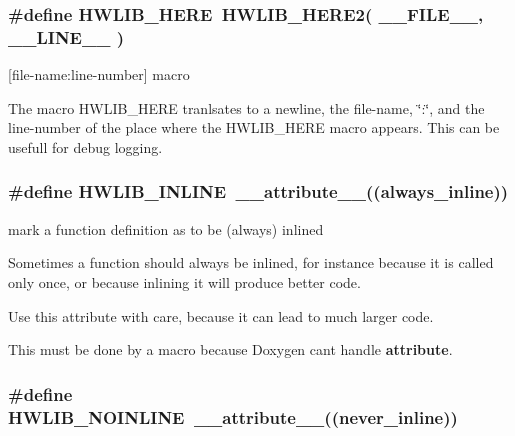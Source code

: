 \subsubsection[{\texorpdfstring{H\+W\+L\+I\+B\+\_\+\+H\+E\+RE}{HWLIB_HERE}}]{\setlength{\rightskip}{0pt plus 5cm}\#define H\+W\+L\+I\+B\+\_\+\+H\+E\+RE~H\+W\+L\+I\+B\+\_\+\+H\+E\+R\+E2( \+\_\+\+\_\+\+F\+I\+L\+E\+\_\+\+\_\+, \+\_\+\+\_\+\+L\+I\+N\+E\+\_\+\+\_\+ )}\hypertarget{hwlib-defines_8hpp_a360fe3b1713068844a760bed1aa1384a}{}\label{hwlib-defines_8hpp_a360fe3b1713068844a760bed1aa1384a}


\mbox{[}file-\/name\+:line-\/number\mbox{]} macro 

The macro H\+W\+L\+I\+B\+\_\+\+H\+E\+RE tranlsates to a newline, the file-\/name, \char`\"{}\+:\char`\"{}, and the line-\/number of the place where the H\+W\+L\+I\+B\+\_\+\+H\+E\+RE macro appears. This can be usefull for debug logging. 
\subsubsection[{\texorpdfstring{H\+W\+L\+I\+B\+\_\+\+I\+N\+L\+I\+NE}{HWLIB_INLINE}}]{\setlength{\rightskip}{0pt plus 5cm}\#define H\+W\+L\+I\+B\+\_\+\+I\+N\+L\+I\+NE~\+\_\+\+\_\+attribute\+\_\+\+\_\+((always\+\_\+inline))}\hypertarget{hwlib-defines_8hpp_a520a8905adc71f1757aea4ce05183585}{}\label{hwlib-defines_8hpp_a520a8905adc71f1757aea4ce05183585}


mark a function definition as to be (always) inlined 

Sometimes a function should always be inlined, for instance because it is called only once, or because inlining it will produce better code.

Use this attribute with care, because it can lead to much larger code.

This must be done by a macro because Doxygen can\textquotesingle{}t handle {\bfseries attribute}. 
\subsubsection[{\texorpdfstring{H\+W\+L\+I\+B\+\_\+\+N\+O\+I\+N\+L\+I\+NE}{HWLIB_NOINLINE}}]{\setlength{\rightskip}{0pt plus 5cm}\#define H\+W\+L\+I\+B\+\_\+\+N\+O\+I\+N\+L\+I\+NE~\+\_\+\+\_\+attribute\+\_\+\+\_\+((never\+\_\+inline))}\hypertarget{hwlib-defines_8hpp_a2bec10dcdff9c6b29f603813007f2ffa}{}\label{hwlib-defines_8hpp_a2bec10dcdff9c6b29f603813007f2ffa}


